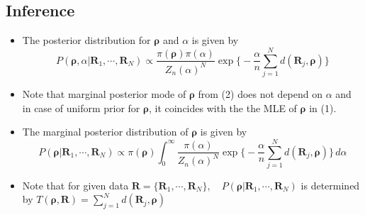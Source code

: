 \documentclass[12pt]{article}
\begin{document}
\subsection{Inference}
\begin{itemize}
    \item The posterior distribution for $\boldsymbol{\rho}$ and $\alpha$ is given by
    \begin{equation}
        P(\boldsymbol{\rho}, \alpha| \mathbf{R}_1, \cdots, \mathbf{R}_N)\propto \frac{\pi(\boldsymbol{\rho})\pi(\alpha)}{Z_n(\alpha)^N} \exp \big\{-\frac{\alpha}{n}\sum_{j=1}^N d(\mathbf{R}_j, \boldsymbol{\rho})\big\}
    \end{equation}
    \item Note that marginal posterior mode of $\boldsymbol{\rho}$ from (2) does not depend on $\alpha$ and in case of uniform prior for $\boldsymbol{\rho}$, it coincides with the the MLE of $\boldsymbol{\rho}$ in (1). 
    \item The marginal posterior distribution of $\boldsymbol{\rho}$ is given by 
    \begin{equation}
        P(\boldsymbol{\rho} | \mathbf{R}_1, \cdots, \mathbf{R}_N)\propto \pi(\boldsymbol{\rho})\int_0^\infty \frac{\pi(\alpha)}{Z_n(\alpha)^N} \exp \big\{-\frac{\alpha}{n}\sum_{j=1}^N d(\mathbf{R}_j, \boldsymbol{\rho})\big\}\, d\alpha
    \end{equation}
    \item Note that for given data $\mathbf{R}=\{\mathbf{R}_1, \cdots, \mathbf{R}_N\},\quad  P(\boldsymbol{\rho} | \mathbf{R}_1, \cdots, \mathbf{R}_N)$ is determined \\ by $T(\boldsymbol{\rho}, \mathbf{R})=\sum_{j=1}^N d(\mathbf{R}_j, \boldsymbol{\rho})$
\end{itemize}
\end{document}
